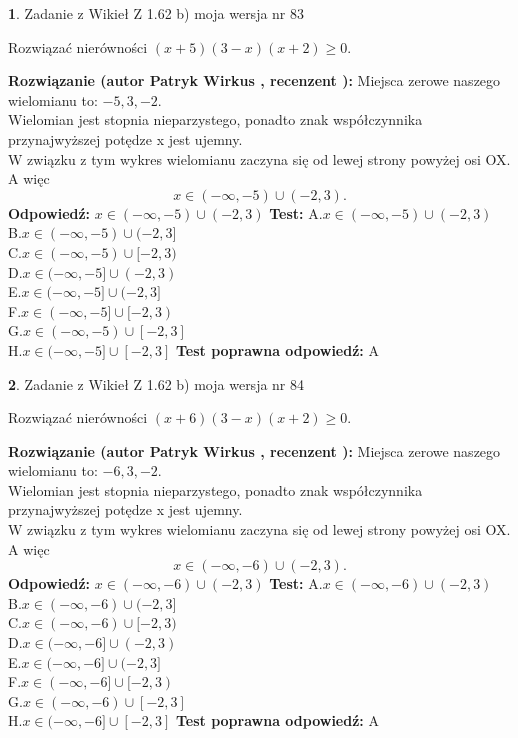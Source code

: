 \documentclass[12pt, a4paper]{article}
\theoremstyle{definition} %
\newtheorem{zad}{}
\newcommand{\zadStart}[1]{\begin{zad}#1\newline}
\newcommand{\zadStop}{\end{zad}}
\newcommand{\rozwStart}[2]{\noindent \textbf{Rozwiązanie (autor #1 , recenzent #2): }\newline}
\newcommand{\rozwStop}{\newline}
\newcommand{\odpStart}{\noindent \textbf{Odpowiedź:}\newline}
\newcommand{\odpStop}{\newline}
\newcommand{\testStart}{\noindent \textbf{Test:}\newline}
\newcommand{\testStop}{\newline}
\newcommand{\kluczStart}{\noindent \textbf{Test poprawna odpowiedź:}\newline}
\newcommand{\kluczStop}{\newline}
\begin{document}
\zadStart{Zadanie z Wikieł Z 1.62 b) moja wersja nr 83}

Rozwiązać nierówności $(x+5)(3-x)(x+2)\ge0$.
\zadStop
\rozwStart{Patryk Wirkus}{}
Miejsca zerowe naszego wielomianu to: $-5, 3, -2$.\\
Wielomian jest stopnia nieparzystego, ponadto znak współczynnika przy\linebreak najwyższej potędze x jest ujemny.\\ W związku z tym wykres wielomianu zaczyna się od lewej strony powyżej osi OX. A więc $$x \in (-\infty,-5) \cup (-2,3).$$
\rozwStop
\odpStart
$x \in (-\infty,-5) \cup (-2,3)$
\odpStop
\testStart
A.$x \in (-\infty,-5) \cup (-2,3)$\\
B.$x \in (-\infty,-5) \cup (-2,3]$\\
C.$x \in (-\infty,-5) \cup [-2,3)$\\
D.$x \in (-\infty,-5] \cup (-2,3)$\\
E.$x \in (-\infty,-5] \cup (-2,3]$\\
F.$x \in (-\infty,-5] \cup [-2,3)$\\
G.$x \in (-\infty,-5) \cup [-2,3]$\\
H.$x \in (-\infty,-5] \cup [-2,3]$
\testStop
\kluczStart
A
\kluczStop



\zadStart{Zadanie z Wikieł Z 1.62 b) moja wersja nr 84}

Rozwiązać nierówności $(x+6)(3-x)(x+2)\ge0$.
\zadStop
\rozwStart{Patryk Wirkus}{}
Miejsca zerowe naszego wielomianu to: $-6, 3, -2$.\\
Wielomian jest stopnia nieparzystego, ponadto znak współczynnika przy\linebreak najwyższej potędze x jest ujemny.\\ W związku z tym wykres wielomianu zaczyna się od lewej strony powyżej osi OX. A więc $$x \in (-\infty,-6) \cup (-2,3).$$
\rozwStop
\odpStart
$x \in (-\infty,-6) \cup (-2,3)$
\odpStop
\testStart
A.$x \in (-\infty,-6) \cup (-2,3)$\\
B.$x \in (-\infty,-6) \cup (-2,3]$\\
C.$x \in (-\infty,-6) \cup [-2,3)$\\
D.$x \in (-\infty,-6] \cup (-2,3)$\\
E.$x \in (-\infty,-6] \cup (-2,3]$\\
F.$x \in (-\infty,-6] \cup [-2,3)$\\
G.$x \in (-\infty,-6) \cup [-2,3]$\\
H.$x \in (-\infty,-6] \cup [-2,3]$
\testStop
\kluczStart
A
\kluczStop
\end{document}
